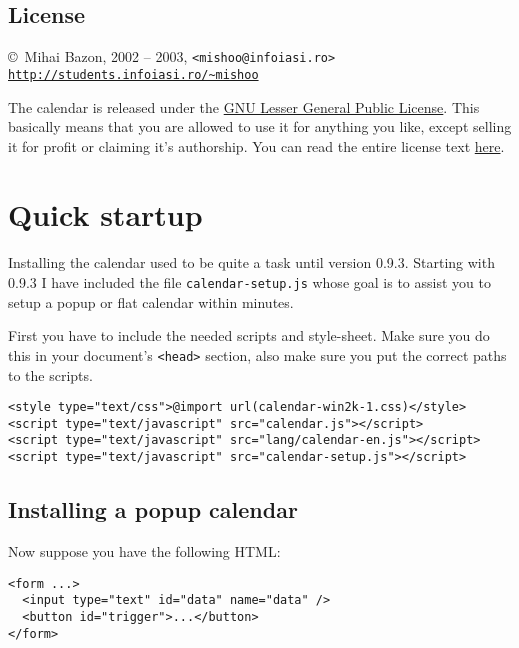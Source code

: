 \documentclass[a4paper,10pt]{article}
\begin{document}
\subsection{License}

\begin{center}
\noindent \copyright\ Mihai Bazon, 2002 -- 2003, \texttt{<mishoo@infoiasi.ro>}\\
\href{http://students.infoiasi.ro/~mishoo}{\texttt{http://students.infoiasi.ro/\~{}mishoo}}\\
\end{center}

The calendar is released under the
{\href{http://www.gnu.org/licenses/lgpl.html}{GNU Lesser General Public
License}}.  This basically means that you are allowed to use it for anything you
like, except selling it for profit or claiming it's authorship.  You can read
the entire license text {\href{http://www.gnu.org/licenses/lgpl.html}{here}}.




\section{Quick startup}\label{sec:quick-start}

Installing the calendar used to be quite a task until version 0.9.3.  Starting
with 0.9.3 I have included the file \texttt{calendar-setup.js} whose goal is to
assist you to setup a popup or flat calendar within minutes.

First you have to include the needed scripts and style-sheet.  Make sure you do
this in your document's \texttt{<head>} section, also make sure you put the
correct paths to the scripts.

\begin{verbatim}
<style type="text/css">@import url(calendar-win2k-1.css)</style>
<script type="text/javascript" src="calendar.js"></script>
<script type="text/javascript" src="lang/calendar-en.js"></script>
<script type="text/javascript" src="calendar-setup.js"></script>
\end{verbatim}

\subsection{Installing a popup calendar}\label{sec:quick-start-popup}

\noindent Now suppose you have the following HTML:

\begin{verbatim}
<form ...>
  <input type="text" id="data" name="data" />
  <button id="trigger">...</button>
</form>
\end{verbatim}
\end{document}
